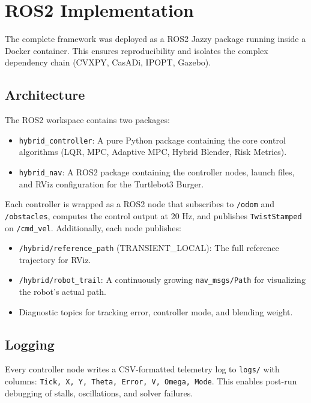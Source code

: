 \documentclass[12pt, a4paper]{article}
\begin{document}
\section{ROS2 Implementation}

The complete framework was deployed as a ROS2 Jazzy package running inside a Docker container. This ensures reproducibility and isolates the complex dependency chain (CVXPY, CasADi, IPOPT, Gazebo).

\subsection{Architecture}
The ROS2 workspace contains two packages:
\begin{itemize}
    \item \texttt{hybrid\_controller}: A pure Python package containing the core control algorithms (LQR, MPC, Adaptive MPC, Hybrid Blender, Risk Metrics).
    \item \texttt{hybrid\_nav}: A ROS2 package containing the controller nodes, launch files, and RViz configuration for the Turtlebot3 Burger.
\end{itemize}

Each controller is wrapped as a ROS2 node that subscribes to \texttt{/odom} and \texttt{/obstacles}, computes the control output at 20 Hz, and publishes \texttt{TwistStamped} on \texttt{/cmd\_vel}. Additionally, each node publishes:
\begin{itemize}
    \item \texttt{/hybrid/reference\_path} (TRANSIENT\_LOCAL): The full reference trajectory for RViz.
    \item \texttt{/hybrid/robot\_trail}: A continuously growing \texttt{nav\_msgs/Path} for visualizing the robot's actual path.
    \item Diagnostic topics for tracking error, controller mode, and blending weight.
\end{itemize}

\subsection{Logging}
Every controller node writes a CSV-formatted telemetry log to \texttt{logs/} with columns: \texttt{Tick, X, Y, Theta, Error, V, Omega, Mode}. This enables post-run debugging of stalls, oscillations, and solver failures.
\end{document}

